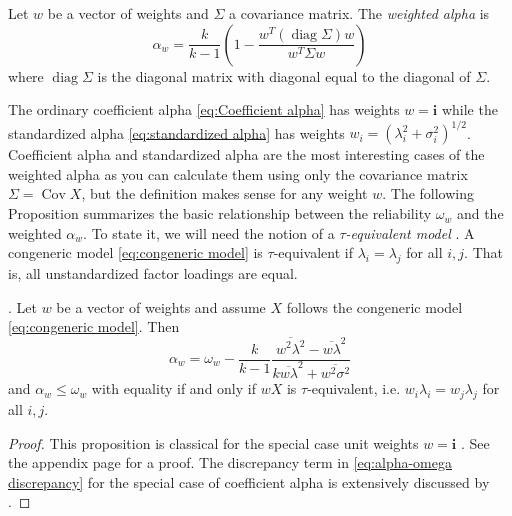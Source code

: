 \documentclass[twoside]{article}
\DeclareMathOperator{\Cov}{Cov}
\DeclareMathOperator{\diag}{diag}
\renewcommand{\sqrt}[1]{{(#1)^{1/2}}}
\begin{document}
\begin{defn}
Let $w$ be a vector of weights and $\Sigma$ a covariance matrix. The \textit{weighted alpha} is
\begin{equation}
\alpha_{w}=\frac{k}{k-1}\left(1-\frac{w^{T}(\diag\Sigma)w}{w^{T}\Sigma w}\right)\label{eq:weighted alpha}
\end{equation}
where $\diag\Sigma$ is the diagonal matrix with diagonal equal to the diagonal of $\Sigma$.
\end{defn}
The ordinary coefficient alpha \eqref{eq:Coefficient alpha} has weights $w=\mathbf{i}$
while the standardized alpha \eqref{eq:standardized alpha} has weights $w_{i}=\sqrt{\lambda_{i}^{2}+\sigma_{i}^{2}}$. Coefficient alpha and standardized alpha are the most interesting cases of the weighted alpha as you can calculate them using only the covariance matrix $\Sigma = \Cov X$, but the definition makes sense for any weight $w$. The following Proposition summarizes the basic relationship
between the reliability $\omega_{w}$ and the weighted $\alpha_{w}$. To state it, we will need
the notion of a \emph{$\tau$-equivalent model} \citep[][section 2.13]{Lord1968-ax}. A congeneric model \eqref{eq:congeneric model} is $\tau$-equivalent if $\lambda_{i}=\lambda_{j}$ for all $i,j$. That is, all unstandardized
factor loadings are equal.
\begin{prop}
\label{prop:weighted alpha}. Let $w$ be a vector of weights and
assume $X$ follows the congeneric model \eqref{eq:congeneric model}. Then 
\begin{equation}
\alpha_{w}=\omega_{w}-\frac{k}{k-1}\frac{\overline{w^{2}\lambda^{2}}-\overline{w\lambda}^{2}}{k\overline{w\lambda}^{2}+\overline{w^{2}\sigma^{2}}}\label{eq:alpha-omega discrepancy}
\end{equation}
and $\alpha_w \leq \omega_w$ with equality if and only if $wX$ is $\tau$-equivalent, i.e. $w_i\lambda_{i}=w_j\lambda_{j}$
for all $i,j$.
\end{prop}
\begin{proof}
This proposition is classical for the special case unit weights $w = \mathbf{i}$ \citep[][pp. 87 -- 89]{Lord1968-ax}. See the appendix page \pageref{proof:weighted alpha}
for a proof. The discrepancy term in \eqref{eq:alpha-omega discrepancy} for the special case of coefficient alpha is extensively discussed by \citet{Raykov1997-bu}. 
\end{proof}

\end{document}
